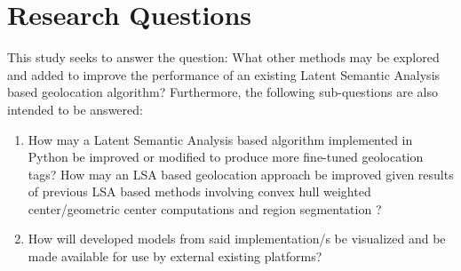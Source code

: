 \section{Research Questions}

 This study seeks to answer the question: What other methods may be explored and added to improve the performance of an existing Latent Semantic Analysis based geolocation algorithm? Furthermore, the following sub-questions are also intended to be answered:

\begin{enumerate}
    \item How may a Latent Semantic Analysis based algorithm implemented in Python be improved or modified to produce more fine-tuned geolocation tags? 
    \subitem How may an LSA based geolocation approach be improved given results of previous LSA based methods involving convex hull weighted center/geometric center computations and region segmentation \cite{ROSALES2017, VELASCOBERMEJODOMINGO2018}?
    \item How will developed models from said implementation/s be visualized and be made available for use by external existing platforms?
    
\end{enumerate}